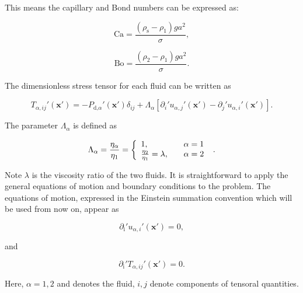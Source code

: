 \documentclass[12pt]{article}
\begin{document}
This means the capillary and Bond numbers can be expressed as:

\begin{equation}
\label{equ:cap_spec}
\text{Ca} = \frac{(\rho_{\text{s}} - \rho_{1}) g a^{2}}{\sigma},
\end{equation}

\begin{equation}
\label{equ:bond_spec}
\text{Bo} = \frac{(\rho_{2} - \rho_{1}) g a^{2}}{\sigma}.
\end{equation}

The dimensionless stress tensor for each fluid can be written as

\begin{equation}
\label{equ:nd_stress_def}
T_{\alpha, ij}'(\boldsymbol{x'}) = -P_{\text{d,} \alpha}'(\boldsymbol{x'}) \delta_{ij} + \Lambda_{\alpha}[\partial_{i}' u_{\alpha, j}'(\boldsymbol{x'}) - \partial_{j}' u_{\alpha, i}'(\boldsymbol{x'})].
\end{equation}

The parameter $\Lambda_{\alpha}$ is defined as

\begin{equation}
\label{equ:Llambda}
\Lambda_{\alpha} = \frac{\eta_{\alpha}}{\eta_{1}} = \left\{
    \begin{array}{l l}
      1, & \quad \alpha = 1 \\
      \frac{\eta_{2}}{\eta_{1}} = \lambda, & \quad \alpha = 2
    \end{array} \right.\ .
\end{equation}

Note $\lambda$ is the viscosity ratio of the two fluids. It is straightforward to apply the general equations of motion and boundary conditions to the problem. The equations of motion, expressed in the Einstein summation convention \citep{Riley06} which will be used from now on, appear as 

\begin{equation}
\label{equ:cont}
\partial_{\text{i}}' u_{\alpha,i}'(\boldsymbol{x'}) = 0,
\end{equation}

and 

\begin{equation}
\label{equ:stokes}
\partial_{\text{i}}' T_{\alpha,ij}'(\boldsymbol{x'}) = 0.
\end{equation}

Here, $\alpha = 1,2$ and denotes the fluid, $i, j$ denote components of tensoral quantities. 
\end{document}
